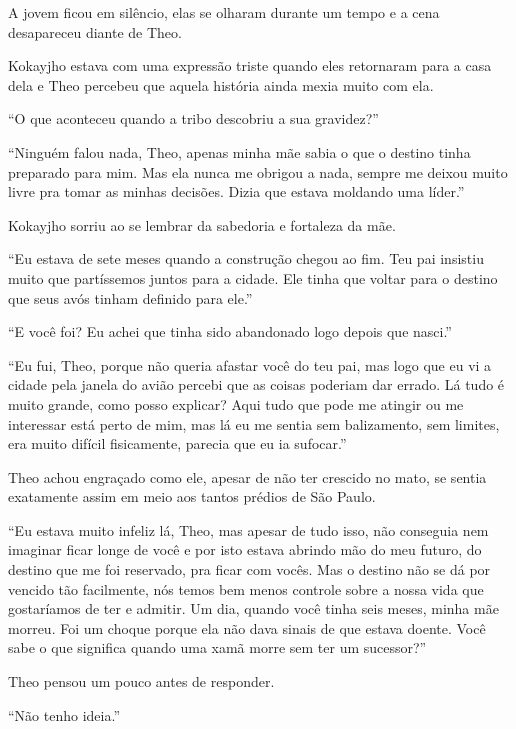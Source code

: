 A jovem ficou em silêncio, elas se olharam durante um tempo e a cena
desapareceu diante de Theo.

\asterisc


Kokayjho estava com uma expressão triste quando eles retornaram para a
casa dela e Theo percebeu que aquela história ainda mexia muito com ela.

``O que aconteceu quando a tribo descobriu a sua gravidez?''

``Ninguém falou nada, Theo, apenas minha mãe sabia o que o destino tinha
preparado para mim. Mas ela nunca me obrigou a nada, sempre me deixou
muito livre pra tomar as minhas decisões. Dizia que estava moldando uma
líder.''

Kokayjho sorriu ao se lembrar da sabedoria e fortaleza da mãe.

``Eu estava de sete meses quando a construção chegou ao fim. Teu pai
insistiu muito que partíssemos juntos para a cidade. Ele tinha que
voltar para o destino que seus avós tinham definido para ele.''

``E você foi? Eu achei que tinha sido abandonado logo depois que
nasci.''

``Eu fui, Theo, porque não queria afastar você do teu pai, mas logo que
eu vi a cidade pela janela do avião percebi que as coisas poderiam dar
errado. Lá tudo é muito grande, como posso explicar? Aqui tudo que pode
me atingir ou me interessar está perto de mim, mas lá eu me sentia sem
balizamento, sem limites, era muito difícil fisicamente, parecia que eu
ia sufocar.''

Theo achou engraçado como ele, apesar de não ter crescido no mato, se
sentia exatamente assim em meio aos tantos prédios de São Paulo.

``Eu estava muito infeliz lá, Theo, mas apesar de tudo isso, não
conseguia nem imaginar ficar longe de você e por isto estava abrindo mão
do meu futuro, do destino que me foi reservado, pra ficar com vocês. Mas
o destino não se dá por vencido tão facilmente, nós temos bem menos
controle sobre a nossa vida que gostaríamos de ter e admitir. Um dia,
quando você tinha seis meses, minha mãe morreu. Foi um choque porque ela
não dava sinais de que estava doente. Você sabe o que significa quando
uma xamã morre sem ter um sucessor?''

Theo pensou um pouco antes de responder.

``Não tenho ideia.''

